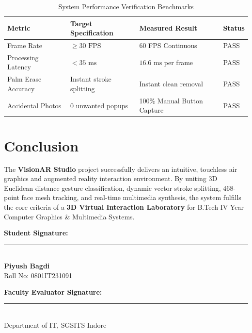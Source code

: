 \documentclass[11pt,a4paper]{article}
\begin{document}
\begin{table}[h]
\centering
\caption{System Performance Verification Benchmarks}
\vspace{2mm}
\begin{tabular}{@{}llll@{}}
\toprule
\textbf{Metric} & \textbf{Target Specification} & \textbf{Measured Result} & \textbf{Status} \\ \midrule
Frame Rate & $\ge 30\text{ FPS}$ & 60 FPS Continuous & PASS \\
Processing Latency & $< 35\text{ ms}$ & $16.6\text{ ms}$ per frame & PASS \\
Palm Erase Accuracy & Instant stroke splitting & Instant clean removal & PASS \\
Accidental Photos & 0 unwanted popups & 100\% Manual Button Capture & PASS \\ \bottomrule
\end{tabular}
\end{table}

\section{Conclusion}
The \textbf{VisionAR Studio} project successfully delivers an intuitive, touchless air graphics and augmented reality interaction environment. By uniting 3D Euclidean distance gesture classification, dynamic vector stroke splitting, 468-point face mesh tracking, and real-time multimedia synthesis, the system fulfills the core criteria of a \textbf{3D Virtual Interaction Laboratory} for B.Tech IV Year Computer Graphics \& Multimedia Systems.

\vspace{1.5cm}
\noindent
\begin{minipage}{0.45\textwidth}
    \textbf{Student Signature:}\\[1.2cm]
    \rule{6cm}{0.4pt}\\
    \textbf{Piyush Bagdi}\\
    Roll No: 0801IT231091
\end{minipage}
\hfill
\begin{minipage}{0.45\textwidth}
    \textbf{Faculty Evaluator Signature:}\\[1.2cm]
    \rule{6cm}{0.4pt}\\
    Department of IT, SGSITS Indore
\end{minipage}
\end{document}
